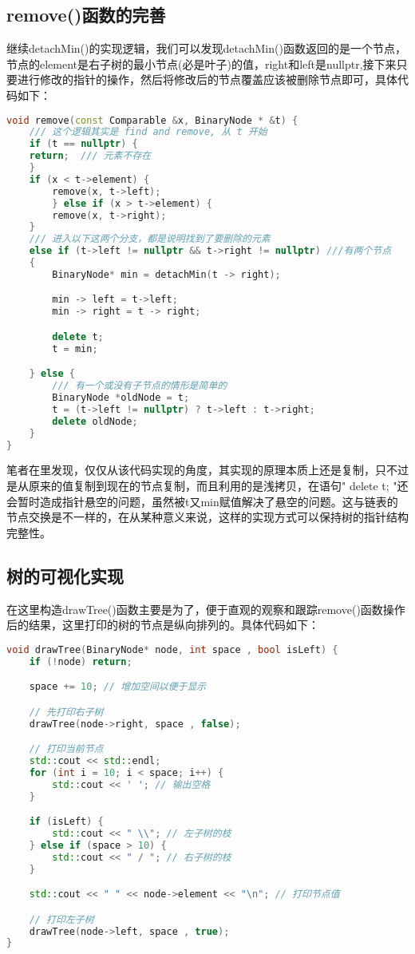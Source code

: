 \documentclass[fontset=fandol]{ctexart}
\begin{document}
\subsection{remove()函数的完善}
继续detachMin()的实现逻辑，我们可以发现detachMin()函数返回的是一个节点，节点的element是右子树的最小节点(必是叶子)的值，right和left是nullptr,接下来只要进行修改的指针的操作，然后将修改后的节点覆盖应该被删除节点即可，具体代码如下：
\begin{lstlisting}[language=C++, caption={remove()函数}]  
void remove(const Comparable &x, BinaryNode * &t) {
    /// 这个逻辑其实是 find and remove, 从 t 开始
    if (t == nullptr) {
    return;  /// 元素不存在
    }
    if (x < t->element) {
        remove(x, t->left);
        } else if (x > t->element) {
        remove(x, t->right);
    } 
    /// 进入以下这两个分支，都是说明找到了要删除的元素
    else if (t->left != nullptr && t->right != nullptr) ///有两个节点
    {
        BinaryNode* min = detachMin(t -> right);

        min -> left = t->left;
        min -> right = t -> right;

        delete t;
        t = min;

    } else {
        /// 有一个或没有子节点的情形是简单的
        BinaryNode *oldNode = t;
        t = (t->left != nullptr) ? t->left : t->right;
        delete oldNode;
    }
}
\end{lstlisting}
笔者在里发现，仅仅从该代码实现的角度，其实现的原理本质上还是复制，只不过是从原来的值复制到现在的节点复制，而且利用的是浅拷贝，在语句" delete t; "还会暂时造成指针悬空的问题，虽然被t又min赋值解决了悬空的问题。这与链表的节点交换是不一样的，在从某种意义来说，这样的实现方式可以保持树的指针结构完整性。

\subsection{树的可视化实现}
在这里构造drawTree()函数主要是为了，便于直观的观察和跟踪remove()函数操作后的结果，这里打印的树的节点是纵向排列的。具体代码如下：
\begin{lstlisting}[language=C++, caption={draw()函数}]  
void drawTree(BinaryNode* node, int space , bool isLeft) {
    if (!node) return;

    space += 10; // 增加空间以便于显示

    // 先打印右子树
    drawTree(node->right, space , false);

    // 打印当前节点
    std::cout << std::endl;
    for (int i = 10; i < space; i++) {
        std::cout << ' '; // 输出空格
    }

    if (isLeft) {
        std::cout << " \\"; // 左子树的枝
    } else if (space > 10) {
        std::cout << " / "; // 右子树的枝
    }

    std::cout << " " << node->element << "\n"; // 打印节点值

    // 打印左子树
    drawTree(node->left, space , true);
}
\end{lstlisting}
\end{document}
